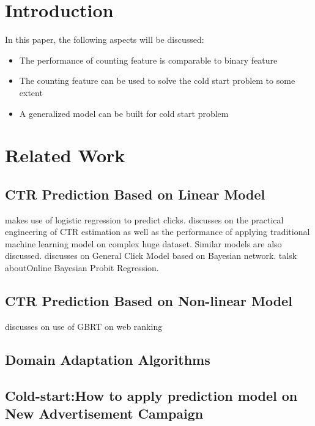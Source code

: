 \documentclass{sig-alternate}
\begin{document}

\keywords{}

\section{Introduction}
In this paper, the following aspects will be discussed:

\begin{itemize}
\item The performance of counting feature is comparable to binary feature
\item The counting feature can be used to solve the cold start problem to some extent
\item A generalized model can be built for cold start problem
\end{itemize}

\section{Related Work}

\subsection{CTR Prediction Based on Linear Model}

 \cite{richardson2007predicting} makes use of logistic regression to predict clicks. \cite{mcmahan2013ad} discusses on the practical engineering of CTR estimation as well as the performance of applying traditional machine learning model on complex huge dataset. Similar models are also discussed. \cite{zhu2010novel} discusses on General Click Model based on Bayesian network. \cite{graepel2010web} talsk aboutOnline Bayesian Probit Regression. 



\subsection{CTR Prediction Based on Non-linear Model}
\cite{mohan2011web} discusses on use of GBRT on web ranking




\subsection{Domain Adaptation Algorithms}
\subsection{Cold-start:How to apply prediction model on New Advertisement Campaign}
\end{document}
